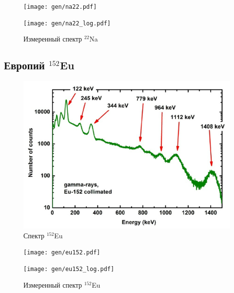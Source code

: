 \documentclass[12pt,a4paper]{article}
\begin{document}
	
	\begin{figure}[H]
		\centering
		\begin{minipage}{0.5\textwidth}
			\centering
			\texttt{[image: gen/na22.pdf]}
		\end{minipage}%
		\begin{minipage}{0.5\textwidth}
			\centering
			\texttt{[image: gen/na22\_log.pdf]}
		\end{minipage}
		\caption{Измеренный спектр $^{22}$Na}
		\label{fig:na_spectrum}
	\end{figure}
	
	
	\subsection*{Европий $^{152}$Eu}
	
	
	
	\begin{figure}[H]
		\centering
		\includegraphics[width=0.7\linewidth]{res/eu_spectre.png}
		\caption{Спектр $^{152}$Eu}
		\label{fig:eu_ref_spectrum}
	\end{figure}
		
	\begin{figure}[H]
		\centering
		\begin{minipage}{0.5\textwidth}
			\centering
			\texttt{[image: gen/eu152.pdf]}
		\end{minipage}%
		\begin{minipage}{0.5\textwidth}
			\centering
			\texttt{[image: gen/eu152\_log.pdf]}
		\end{minipage}
		\caption{Измеренный спектр $^{152}$Eu}
		\label{fig:eu_spectrum}
	\end{figure}
	
\end{document}
